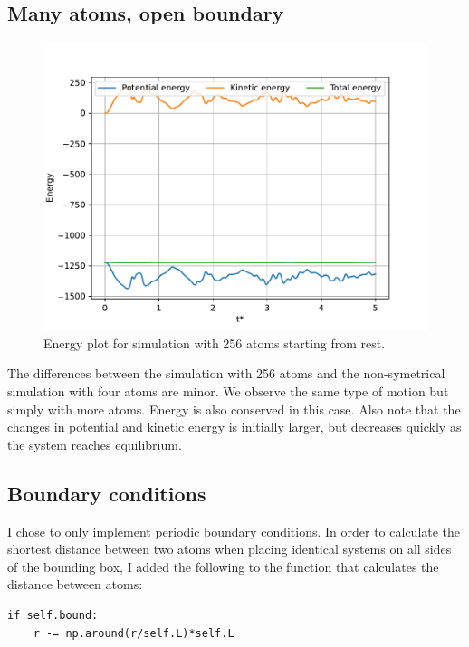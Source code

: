 \documentclass[a4paper,10pt,english]{article}
\begin{document}
\newpage

\subsection{Many atoms, open boundary} \label{3d}

\begin{figure}[h!]
    \centering
    \includegraphics[scale=0.65]{../figures/3_d.pdf}
    \caption{Energy plot for simulation with 256 atoms starting from rest.}
    \label{fig:energyplots4}
\end{figure}

The differences between the simulation with 256 atoms and the non-symetrical simulation with four atoms are minor. We observe the same type of motion but simply with more atoms. Energy is also conserved in this case. Also note that the changes in potential and kinetic energy is initially larger, but decreases quickly as the system reaches equilibrium.

\subsection{Boundary conditions} \label{3e}

I chose to only implement periodic boundary conditions. In order to calculate the shortest distance between two atoms when placing identical systems on all sides of the bounding box, I added the following to the function that calculates the distance between atoms:
\begin{lstlisting}
if self.bound:
    r -= np.around(r/self.L)*self.L
\end{lstlisting}
\end{document}
